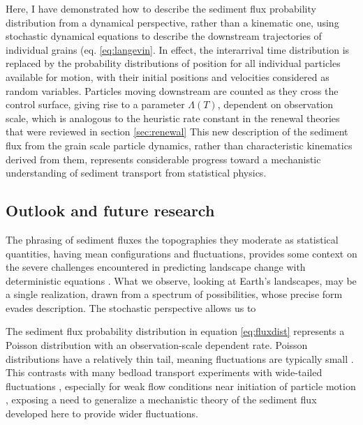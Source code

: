 Here, I have demonstrated how to describe the sediment flux probability distribution from a dynamical perspective, rather than a kinematic one, using stochastic dynamical equations to describe the downstream trajectories of individual grains (eq. \ref{eq:langevin}.
In effect, the interarrival time distribution is replaced by the probability distributions of position for all individual particles available for motion, with their initial positions and velocities considered as random variables.
Particles moving downstream are counted as they cross the control surface, giving rise to a parameter $\Lambda(T)$, dependent on observation scale, which is analogous to the heuristic rate constant in the renewal theories that were reviewed in section \ref{sec:renewal} \citep{Turowski2010,Ancey2020}
This new description of the sediment flux from the grain scale particle dynamics, rather than characteristic kinematics derived from them, represents considerable progress toward a mechanistic understanding of sediment transport from statistical physics.

\subsection{Outlook and future research}

The phrasing of sediment fluxes the topographies they moderate as statistical quantities, having mean configurations and fluctuations, provides some context on the severe challenges encountered in predicting landscape change with deterministic equations \citep{}.
What we observe, looking at Earth's landscapes, may be a single realization, drawn from a spectrum of possibilities, whose precise form evades description. 
The stochastic perspective allows us to 

The sediment flux probability distribution in equation \ref{eq:fluxdist} represents a Poisson distribution with an observation-scale dependent rate.
Poisson distributions have a relatively thin tail, meaning fluctuations are typically small \citep{Ancey2006}. This contrasts with many bedload transport experiments with wide-tailed fluctuations \citep{Ancey2008,Heyman2016,Fathel2015}, especially for weak flow conditions near initiation of particle motion \citep{Benavides2021}, exposing a need to generalize a mechanistic theory of the sediment flux developed here to provide wider fluctuations.

